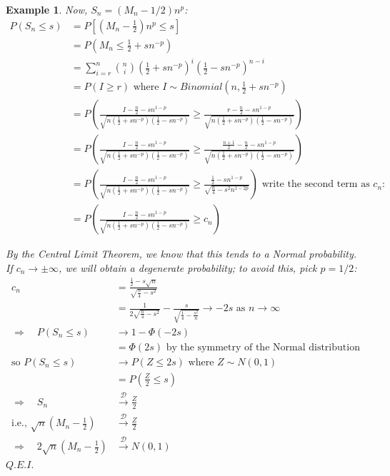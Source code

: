 \documentclass[12pt,a4paper]{article}
\newtheorem{ex}[thm]{Example}
\begin{document}
\begin{ex}
Now, $S_n = (M_n - 1/2)n^p$:
\begin{align*}
P(S_n\leq s) &= P\left[ \left(M_n-\frac{1}{2}\right)n^p \leq s\right]\\
&= P\left(M_n \leq \frac{1}{2} + sn^{-p}\right)\\
&= \sum_{i=r}^n \binom{n}{i} \left(\frac{1}{2}+sn^{-p}\right)^i\left(\frac{1}{2}-sn^{-p}\right)^{n-i}\\
&= P(I\geq r) \mbox{ where $I\sim Binomial\left(n,\frac{1}{2}+sn^{-p}\right)$}\\
&= P\left(\frac{I-\frac{n}{2}-sn^{1-p}}{\sqrt{n\left(\frac{1}{2} + sn^{-p}\right)\left(\frac{1}{2}-sn^{-p}\right)}} \geq \frac{r-\frac{n}{2}-sn^{1-p}}{\sqrt{n\left(\frac{1}{2} + sn^{-p}\right)\left(\frac{1}{2}-sn^{-p}\right)}}\right)\\
&= P\left(\frac{I-\frac{n}{2}-sn^{1-p}}{\sqrt{n\left(\frac{1}{2} + sn^{-p}\right)\left(\frac{1}{2}-sn^{-p}\right)}} \geq \frac{\frac{n+1}{2}-\frac{n}{2} - sn^{1-p}}{\sqrt{n\left(\frac{1}{2}+sn^{-p}\right)\left(\frac{1}{2}-sn^{-p}\right)}}\right)\\
&=  P\left(\frac{I-\frac{n}{2}-sn^{1-p}}{\sqrt{n\left(\frac{1}{2} + sn^{-p}\right)\left(\frac{1}{2}-sn^{-p}\right)}} \geq \frac{\frac{1}{2}-sn^{1-p}}{\sqrt{\frac{n}{4}-s^2n^{1-2p}}}\right)\mbox{ write the second term as $c_n$:}\\
&= P\left(\frac{I-\frac{n}{2}-sn^{1-p}}{\sqrt{n\left(\frac{1}{2} + sn^{-p}\right)\left(\frac{1}{2}-sn^{-p}\right)}} \geq c_n\right)
\end{align*}

By the Central Limit Theorem, we know that this tends to a Normal probability. If $c_n\to\pm\infty$, we will obtain a degenerate probability; to avoid this, pick $p=1/2$:
\begin{align*}
c_n &= \frac{\frac{1}{2}-s\sqrt{n}}{\sqrt{\frac{n}{4}-s^2}}\\
&= \frac{1}{2\sqrt{\frac{n}{4}-s^2}} - \frac{s}{\sqrt{\frac{1}{4}-\frac{s^2}{n}}} \to -2s \mbox{ as $n\to\infty$}\\
\Rightarrow\quad P(S_n\leq s) &\to 1-\Phi(-2s)\\
&=\Phi(2s)\mbox{ by the symmetry of the Normal distribution}\\
\mbox{so } P(S_n\leq s)&\to P(Z\leq 2s)\mbox{ where $Z\sim N(0,1)$}\\
&= P\left(\frac{Z}{2}\leq s\right)\\
\Rightarrow\quad S_n &\xrightarrow{\mathscr{D}} \frac{Z}{2}\\
\mbox{i.e., } \sqrt{n}\left(M_n - \frac{1}{2}\right) &\xrightarrow{\mathscr{D}} \frac{Z}{2}\\
\Rightarrow\quad 2\sqrt{n}\left(M_n - \frac{1}{2}\right) &\xrightarrow{\mathscr{D}} N(0,1)
\end{align*}\hfill$Q.E.I.$

\end{ex}
\end{document}
